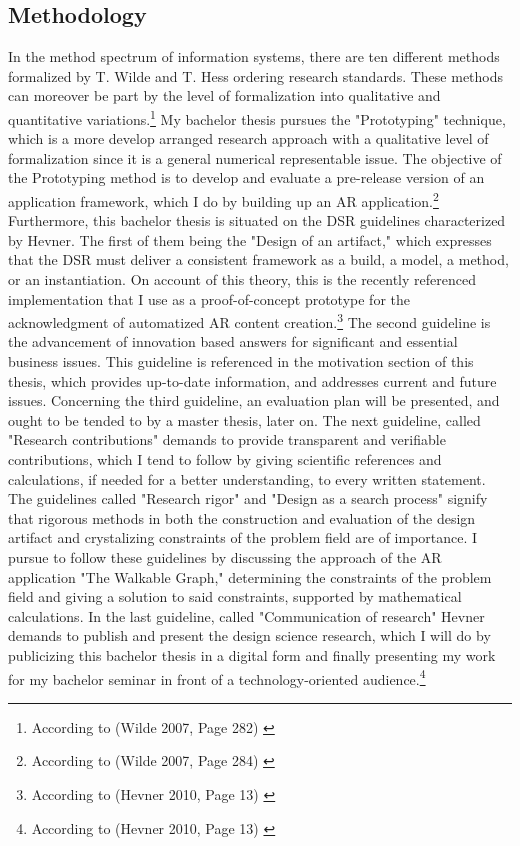 \documentclass[12pt,a4paper,oneside,american,parskip=half]{article}
\makeatletter
\newcommand\footnoteref[1]{\protected@xdef\@thefnmark{\ref{#1}}\@footnotemark}
\makeatother
\begin{document}
\begin{justify}
\begin{normalsize}
\subsection{Methodology}
In the method spectrum of information systems, there are ten different methods formalized by T. Wilde and T. Hess ordering research standards. These methods can moreover be part by the level of formalization into qualitative and quantitative variations.\footnote{According to (Wilde 2007, Page 282) \cite{wilde}}
My bachelor thesis pursues the "Prototyping" technique, which is a more develop arranged research approach with a qualitative level of formalization since it is a general numerical representable issue. The objective of the Prototyping method is to develop and evaluate a pre-release version of an application framework, which I do by building up an AR application.\footnote{According to (Wilde 2007, Page 284) \cite{wilde}}
\newline
Furthermore, this bachelor thesis is situated on the \ac{DSR} guidelines characterized by Hevner.
The first of them being the "Design of an artifact," which expresses that the DSR must deliver a consistent framework as a build, a model, a method, or an instantiation. On account of this theory, this is the recently referenced implementation that I use as a proof-of-concept prototype for the acknowledgment of automatized AR content creation.\footnote{\label{note1}According to (Hevner 2010, Page 13) \cite{hevner}}
\newline
The second guideline is the advancement of innovation based answers for significant and essential business issues. This guideline is referenced in the motivation section of this thesis, which provides up-to-date information, and addresses current and future issues.  
Concerning the third guideline, an evaluation plan will be presented, and ought to be tended to by a master thesis, later on.
The next guideline, called "Research contributions" demands to provide transparent and verifiable contributions, which I tend to follow by giving scientific references and calculations, if needed for a better understanding, to every written statement. The guidelines called "Research rigor" and "Design as a search process" signify that rigorous methods in both the construction and evaluation of the design artifact and crystalizing constraints of the problem field are of importance. I pursue to follow these guidelines by discussing the approach of the AR application "The Walkable Graph," determining the constraints of the problem field and giving a solution to said constraints, supported by mathematical calculations.\footnoteref{note1}
\newline
In the last guideline, called "Communication of research" Hevner demands to publish and present the design science research, which I will do by publicizing this bachelor thesis in a digital form and finally presenting my work for my bachelor seminar in front of a technology-oriented audience.\footnote{According to (Hevner 2010, Page 13) \cite{hevner}}


\end{normalsize}
\end{justify}
\end{document}
